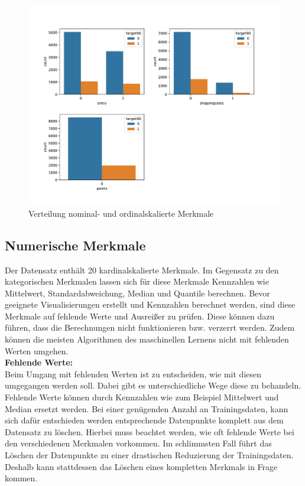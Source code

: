 \begin{figure}[!t]
\begin{center}
\includegraphics[scale=0.5]{pdf/distCategorical2.pdf}
\end{center}
\caption{Verteilung nominal- und ordinalskalierte Merkmale}
\label{fig:distC2}
\end{figure}
\FloatBarrier
\pagebreak

\subsection{Numerische Merkmale}
Der Datensatz enthält 20 kardinalskalierte Merkmale. Im Gegensatz zu den kategorischen Merkmalen lassen sich für diese Merkmale Kennzahlen wie Mittelwert, Standardabweichung, Median und Quantile berechnen. Bevor geeignete Visualisierungen erstellt und Kennzahlen berechnet werden, sind diese Merkmale auf fehlende Werte und Ausreißer zu prüfen. Diese können dazu führen, dass die Berechnungen nicht funktionieren bzw. verzerrt werden. Zudem können die meisten Algorithmen des maschinellen Lernens nicht mit fehlenden Werten umgehen.\\

\textbf{Fehlende Werte:}\\

Beim Umgang mit fehlenden Werten ist zu entscheiden, wie mit diesen umgegangen werden soll. Dabei gibt es unterschiedliche Wege diese zu behandeln. Fehlende Werte können durch Kennzahlen wie zum Beispiel Mittelwert und Median ersetzt werden. Bei einer genügenden Anzahl an Trainingsdaten, kann sich dafür entschieden werden entsprechende Datenpunkte komplett aus dem Datensatz zu löschen. Hierbei muss beachtet werden, wie oft fehlende Werte bei den verschiedenen Merkmalen vorkommen. Im schlimmsten Fall führt das Löschen der Datenpunkte zu einer drastischen Reduzierung der Trainingsdaten. Deshalb kann stattdessen das Löschen eines kompletten Merkmals in Frage kommen.\\ 


